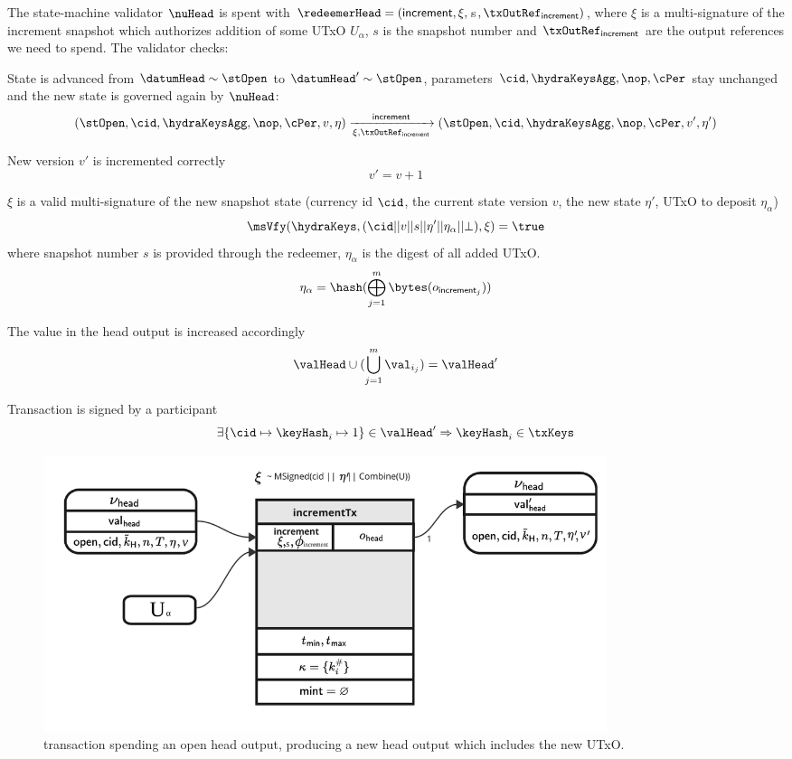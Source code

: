 \noindent The state-machine validator $\nuHead$ is spent with
$\redeemerHead = (\mathsf{increment}, \xi, $s$, \txOutRef_{\mathsf{increment}})$, where $\xi$ is a multi-signature of
the increment snapshot which authorizes addition of some UTxO $U_\alpha$, $s$ is the snapshot number and $\txOutRef_{\mathsf{increment}}$ are the output references we need to spend. The
validator checks:
\begin{menumerate}
	\item State is advanced from $\datumHead \sim \stOpen$ to
	$\datumHead' \sim \stOpen$, parameters $\cid,\hydraKeysAgg,\nop,\cPer$
	stay unchanged and the new state is governed again by $\nuHead$:
	\[
		(\stOpen,\cid,\hydraKeysAgg,\nop,\cPer,v,\eta) \xrightarrow[\xi, \txOutRef_{\mathsf{increment}}]{\mathsf{increment}} (\stOpen,\cid,\hydraKeysAgg,\nop,\cPer,v',\eta')
	\]
	\item New version $v'$ is incremented correctly
	\[
		v' = v + 1
	\]
\item $\xi$ is a valid multi-signature of the new snapshot state (currency id $\cid$, the current state version $v$, the new state $\eta'$, UTxO to deposit $\eta_\alpha$)
	\[
    \msVfy(\hydraKeys,(\cid || v || s || \eta' || \eta_\alpha || \bot),\xi) = \true
	\]
  where snapshot number $s$ is provided through the redeemer, $\eta_\alpha$ is the digest of all added UTxO.
	\[
    \eta_\alpha = \hash(\bigoplus_{j=1}^m \bytes(o_{\mathsf{increment}_j}))
	\]
	\item The value in the head output is increased accordingly
	\[
		\valHead \cup (\bigcup_{j=1}^m \val_{i_{j}}) = \valHead'
	\]
	\item Transaction is signed by a participant
	\[
		\exists \{\cid \mapsto \keyHash_{i} \mapsto 1\} \in \valHead' \Rightarrow \keyHash_{i} \in \txKeys
	\]
\end{menumerate}

\begin{figure}
	\centering
	\includegraphics[width=0.8\textwidth]{Hydra/Protocol/Figures/incrementTx.pdf}
	\caption{\mtxIncrement{} transaction spending an open head output,
		producing a new head output which includes the new UTxO.}\label{fig:incrementTx}
\end{figure}

